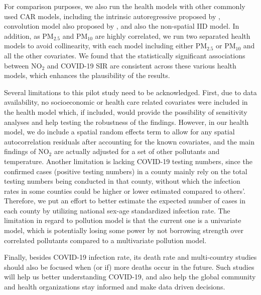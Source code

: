 \documentclass[12,]{article}
\begin{document}
For comparison purposes, we also run the health models with other
commonly used CAR models, including the intrinsic autoregressive
proposed by \textcite{Besag1991}, convolution model also proposed by
\textcite{Besag1991}, and also the non-spatial IID model. In addition,
as PM\(_{2.5}\) and PM\(_{10}\) are highly correlated, we run two
separated health models to avoid collinearity, with each model including
either PM\(_{2.5}\) or PM\(_{10}\) and all the other covariates. We
found that the statistically significant associations between NO\(_2\)
and COVID-19 SIR are consistent across these various health models,
which enhances the plausibility of the results.

Several limitations to this pilot study need to be acknowledged. First,
due to data availability, no socioeconomic or health care related
covariates were included in the health model which, if included, would
provide the possibility of sensitivity analyses and help testing the
robustness of the findings. However, in our health model, we do include
a spatial random effects term to allow for any spatial autocorrelation
residuals after accounting for the known covariates, and the main
findings of NO\(_2\) are actually adjusted for a set of other pollutants
and temperature. Another limitation is lacking COVID-19 testing numbers,
since the confirmed cases (positive testing numbers) in a county mainly
rely on the total testing numbers being conducted in that county,
without which the infection rates in some counties could be higher or
lower estimated compared to others'. Therefore, we put an effort to
better estimate the expected number of cases in each county by utilizing
national sex-age standardized infection rate. The limitation in regard
to pollution model is that the current one is a univariate model, which
is potentially losing some power by not borrowing strength over
correlated pollutants compared to a multivariate pollution model.

Finally, besides COVID-19 infection rate, its death rate and
multi-country studies should also be focused when (or if) more deaths
occur in the future. Such studies will help us better understanding
COVID-19, and also help the global community and health organizations
stay informed and make data driven decisions.
\end{document}
